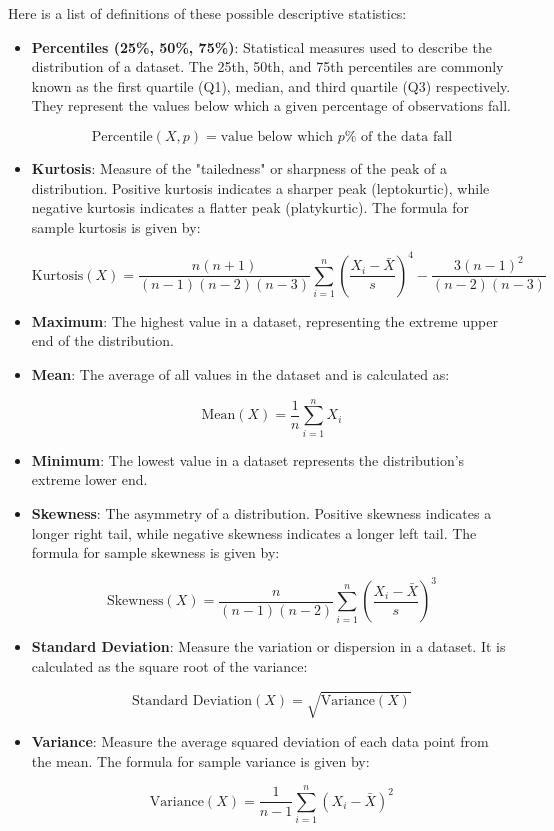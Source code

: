 Here is a list of definitions of these possible descriptive statistics:

\begin{itemize}
    \item \textbf{Percentiles (25\%, 50\%, 75\%)}: Statistical measures used to describe the distribution of a dataset. The 25th, 50th, and 75th percentiles are commonly known as the first quartile (Q1), median, and third quartile (Q3) respectively. They represent the values below which a given percentage of observations fall.

\[
\text{{Percentile}}(X, p) = \text{{value below which }} p\% \text{{ of the data fall}}
\]

    \item \textbf{Kurtosis}: Measure of the "tailedness" or sharpness of the peak of a distribution. Positive kurtosis indicates a sharper peak (leptokurtic), while negative kurtosis indicates a flatter peak (platykurtic). The formula for sample kurtosis is given by:

\[
\text{{Kurtosis}}(X) = \frac{n(n+1)}{(n-1)(n-2)(n-3)} \sum_{i=1}^{n} \left(\frac{X_i - \bar{X}}{s}\right)^4 - \frac{3(n-1)^2}{(n-2)(n-3)}
\]

    \item \textbf{Maximum}: The highest value in a dataset, representing the extreme upper end of the distribution.

    \item \textbf{Mean}: The average of all values in the dataset and is calculated as:

\[
\text{{Mean}}(X) = \frac{1}{n} \sum_{i=1}^{n} X_i
\]

    \item \textbf{Minimum}: The lowest value in a dataset represents the distribution's extreme lower end.

    \item \textbf{Skewness}: The asymmetry of a distribution. Positive skewness indicates a longer right tail, while negative skewness indicates a longer left tail. The formula for sample skewness is given by:

\[
\text{{Skewness}}(X) = \frac{n}{(n-1)(n-2)} \sum_{i=1}^{n} \left(\frac{X_i - \bar{X}}{s}\right)^3
\]

    \item \textbf{Standard Deviation}: Measure the variation or dispersion in a dataset. It is calculated as the square root of the variance:

\[
\text{{Standard Deviation}}(X) = \sqrt{\text{{Variance}}(X)}
\]

    \item \textbf{Variance}: Measure the average squared deviation of each data point from the mean. The formula for sample variance is given by:

\[
\text{{Variance}}(X) = \frac{1}{n-1} \sum_{i=1}^{n} (X_i - \bar{X})^2
\]

\end{itemize}

